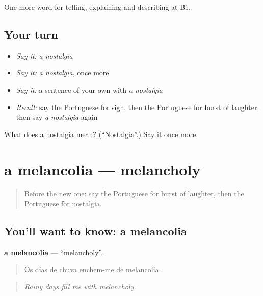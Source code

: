 \begin{grammarlens}[title={What you've built}]
One more word for telling, explaining and describing at B1.
\end{grammarlens}

\subsection*{Your turn}
\begin{itemize}
\raggedright
  \item \emph{Say it:} \emph{a nostalgia}
  \item \emph{Say it:} \emph{a nostalgia}, once more
  \item \emph{Say it:} a sentence of your own with \emph{a nostalgia}
  \item \emph{Recall:} say the Portuguese for sigh, then the Portuguese for burst of laughter, then say \emph{a nostalgia} again
\end{itemize}

\begin{tcolorbox}[breakable,colback=teal!4,colframe=teal!35!black,title={Before you move on}]
What does a nostalgia mean? (\textquotedblleft{}Nostalgia\textquotedblright{}.) Say it once more.
\end{tcolorbox}
\section[a melancolia]{a melancolia — melancholy}

\label{lesson:PT-C478-melancolia}



\begin{quote}
Before the new one: say the Portuguese for burst of laughter, then the Portuguese for nostalgia.
\end{quote}

\subsection*{You'll want to know: a melancolia}
\textbf{a melancolia} — \textquotedblleft{}melancholy\textquotedblright{}.

\begin{quote}
Os dias de chuva enchem-me de melancolia.
\end{quote}

\begin{quote}
\emph{Rainy days fill me with melancholy.}
\end{quote}

